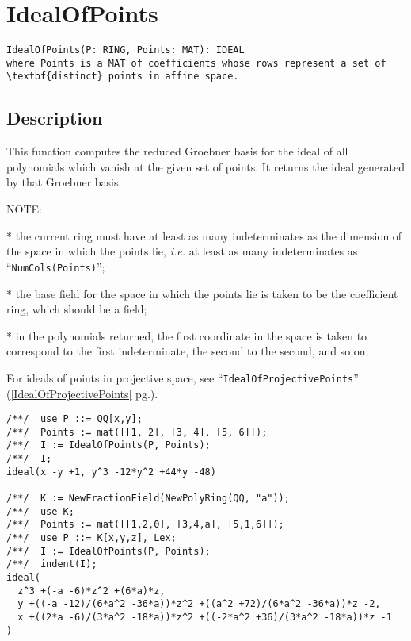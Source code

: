 \documentclass[a4paper]{mybook}
\newenvironment{command}{}{} %
\begin{document}
\section{IdealOfPoints}
\label{IdealOfPoints}
\begin{command} %


\begin{Verbatim}[label=syntax, rulecolor=\color{MidnightBlue},
frame=single]
IdealOfPoints(P: RING, Points: MAT): IDEAL
where Points is a MAT of coefficients whose rows represent a set of
\textbf{distinct} points in affine space.
\end{Verbatim}


\subsection*{Description}

This function computes the reduced Groebner basis for the ideal of all
polynomials which vanish at the given set of points.  It returns the
ideal generated by that Groebner basis.
\par 
NOTE:
\par 
 * the current ring must have at least as many indeterminates as the
   dimension of the space in which the points lie, \textit{i.e.} at
   least as many indeterminates as ``\verb&NumCols(Points)&'';
\par 
 * the base field for the space in which the points lie is taken to be
   the coefficient ring, which should be a field;
\par 
 * in the polynomials returned, the first coordinate in the space is
   taken to correspond to the first indeterminate, the second to the
   second, and so on;











For ideals of points in projective space, see ``\verb&IdealOfProjectivePoints&'' (\ref{IdealOfProjectivePoints} pg.\pageref{IdealOfProjectivePoints}).
\begin{Verbatim}[label=example, rulecolor=\color{PineGreen}, frame=single]
/**/  use P ::= QQ[x,y];
/**/  Points := mat([[1, 2], [3, 4], [5, 6]]);
/**/  I := IdealOfPoints(P, Points);
/**/  I;
ideal(x -y +1, y^3 -12*y^2 +44*y -48)

/**/  K := NewFractionField(NewPolyRing(QQ, "a"));
/**/  use K;
/**/  Points := mat([[1,2,0], [3,4,a], [5,1,6]]);
/**/  use P ::= K[x,y,z], Lex;
/**/  I := IdealOfPoints(P, Points);
/**/  indent(I);
ideal(
  z^3 +(-a -6)*z^2 +(6*a)*z,
  y +((-a -12)/(6*a^2 -36*a))*z^2 +((a^2 +72)/(6*a^2 -36*a))*z -2,
  x +((2*a -6)/(3*a^2 -18*a))*z^2 +((-2*a^2 +36)/(3*a^2 -18*a))*z -1
)
\end{Verbatim}



\end{command}
\end{document}
